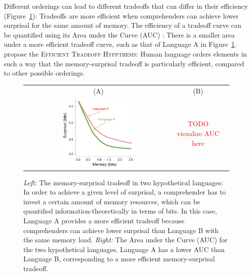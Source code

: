 \documentclass[11pt,letterpaper]{article}
\newcommand{\citep}{\parencite}
\newcommand{\citet}{\Textcite}
\newcommand\mhahn[1]{{\color{red}(#1)}}
\begin{document}
Different orderings can lead to different tradeoffs that can differ in their efficiency (Figure~\ref{fig:tradeoff}): Tradeoffs are more efficient when comprehenders can achieve lower surprisal for the same amount of memory.
The efficiency of a tradeoff curve can be quantified using its Area under the Curve (AUC) \citep{Hahn2020modeling}: There is a smaller area under a more efficient tradeoff curve, such as that of Language A in Figure~\ref{fig:tradeoff}.
\citet{Hahn2020modeling} propose the \textsc{Efficient Tradeoff Hyppthesis}: Human language orders elements in such a way that the memory-surprisal tradeoff is particularly efficient, compared to other possible orderings.

\begin{figure}
    \centering
    \begin{tabular}{ccc}
    (A) & (B) \\
    \includegraphics[width=0.5\textwidth]{figures/tradeoff.pdf} & \textcolor{red}{TODO visualize AUC here}
    \end{tabular}
    \caption{\textit{Left:} The memory-surprisal tradeoff in two hypothetical languages: In order to achieve a given level of surprisal, a comprehender has to invest a certain amount of memory resources, which can be quantified information-theoretically in terms of bits. In this case, Language A provides a more efficient tradeoff because comprehenders can achieve lower surprisal than Language B with the same  memory load.
    \textit{Right:} The Area under the Curve (AUC) for the two hypothetical languages. Language A has a lower AUC than Language B, corresponding to a more efficient memory-surprisal tradeoff.}
    \label{fig:tradeoff}
\end{figure}
\end{document}
